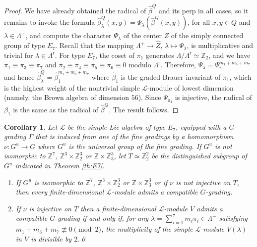 \documentclass[a4paper,reqno]{amsart}
\newtheorem{corollary}[theorem]{Corollary}
\theoremstyle{definition}
\numberwithin{theorem}{section}
\numberwithin{equation}{section}
\begin{document}
\begin{proof}
We have already obtained the radical of $\hat{\beta}^Q$ and its perp in all cases, so it remains to invoke the formula  $\hat{\beta}^Q_\lambda(x,y)=\Psi_\lambda(\hat{\beta}^Q(x,y))$, for all $x,y\in Q$ and $\lambda\in\Lambda^+$, and compute the character $\Psi_\lambda$ of the center $Z$ of the simply connected group of type $E_7$. Recall that the mapping $\Lambda^+\to{\widehat{{Z}}},\,\lambda\mapsto\Psi_\lambda$, is multiplicative and trivial for $\lambda\in\Lambda^\mathrm{r}$. 
For type $E_7$, the coset of ${\pi}_1$ generates $\Lambda/\Lambda^\mathrm{r}\simeq{\mathbb{Z}}_2$, and we have ${\pi}_1\equiv{\pi}_3\equiv{\pi}_7$ and ${\pi}_2\equiv{\pi}_4\equiv{\pi}_5\equiv{\pi}_6\equiv 0$ modulo $\Lambda^\mathrm{r}$. 
Therefore, $\Psi_\lambda=\Psi_{{\pi}_1}^{m_1+m_3+m_7}$ and hence $\hat{\beta}^Q_\lambda=\hat{\beta}_1^{m_1+m_3+m_7}$ where $\hat{\beta}_1$ is the graded Brauer invariant of ${\pi}_1$, which is the highest weight of the nontrivial simple ${\mathcal{L}}$-module of lowest dimension (namely, the Brown algebra of dimension $56$). Since $\Psi_{{\pi}_1}$ is injective, the radical of $\beta_1$ is the same as the radical of $\hat{\beta}^Q$. The result follows.
\end{proof}

\begin{corollary}
Let ${\mathcal{L}}$ be the simple Lie algebra of type $E_7$, equipped with a $G$-grading $\Gamma$ that is induced from one of the fine gradings by a homomorphism $\nu\colon G^u\to G$ where $G^u$ is the universal group of the fine grading. If $G^u$ is not isomorphic to ${\mathbb{Z}}^7$, ${\mathbb{Z}}^3\times{\mathbb{Z}}_2^3$ or ${\mathbb{Z}}\times{\mathbb{Z}}_3^3$, let $T\simeq{\mathbb{Z}}_2^2$ be the distinguished subgroup of $G^u$ indicated in Theorem \ref{th:E7}. 
\begin{enumerate}
\item[(a)] If $G^u$ is isomorphic to ${\mathbb{Z}}^7$, ${\mathbb{Z}}^3\times{\mathbb{Z}}_2^3$ or ${\mathbb{Z}}\times{\mathbb{Z}}_3^3$ or if $\nu$ is not injective on $T$, then every finite-dimensional ${\mathcal{L}}$-module admits a compatible $G$-grading. 
\item[(b)] If $\nu$ is injective on $T$ then a finite-dimensional ${\mathcal{L}}$-module $V$ admits a compatible $G$-grading if and only if, for any $\lambda=\sum_{i=1}^7 m_i{\pi}_i\in\Lambda^+$ satisfying $m_1+m_3+m_7\not\equiv 0\pmod{2}$, the multiplicity of the simple ${\mathcal{L}}$-module $V(\lambda)$ in $V$ is divisible by $2$.\qed
\end{enumerate}
\end{corollary}
\end{document}
